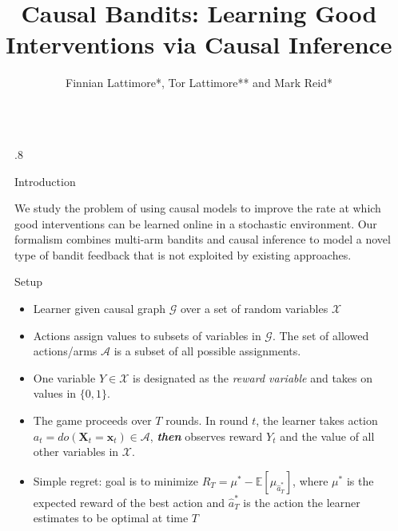 \documentclass[12pt]{beamer}
\title{Causal Bandits: Learning Good Interventions via Causal Inference} %
\author{Finnian Lattimore*, Tor Lattimore** and Mark Reid*} %
\institute{*Australian National University and Data61, ** Indiana University Bloomington} %
\newlength{\sepwid}
\newlength{\onecolwid}
\newcommand{\E}[1]{\mathbb E\left[#1\right]}
\newcommand{\simpleregret}{R_T}
\let\vec\mathbf
\begin{document}

\setlength{\belowcaptionskip}{12pt} %


\begin{frame}[t] %

\begin{columns}[t] %

\begin{column}{\sepwid}\end{column} %

\begin{column}{.8\onecolwid} %


\begin{block}{Introduction}

We study the problem of using causal models to improve the rate at which good interventions can be learned online in a stochastic environment. 
Our formalism combines multi-arm bandits and causal inference to model a novel type of bandit feedback that is not exploited by existing approaches.
\end{block}

\begin{block}{Setup}
\begin{itemize}
\setlength\itemsep{28pt}
\item Learner given causal graph $\mathcal{G}$ over a set of random variables $\mathcal{X}$
\item Actions assign values to subsets of variables in $\mathcal{G}$. The set of allowed actions/arms $\mathcal{A}$ is a subset of all possible assignments.
\item One variable $Y \in \mathcal{X}$ is designated as the \emph{reward variable} and takes on values in $\{0, 1\}$.
\item The game proceeds over $T$ rounds. In round $t$, the learner takes action $a_t = do(\vec{X}_t = \vec{x}_t) \in \mathcal{A}$, \textbf{\emph{then}} observes reward $Y_t$ and the value of all other variables in $\mathcal{X}$.
\item Simple regret: goal is to minimize $\simpleregret = \mu^* - \E{\mu_{\hat a^*_T}}$, where $\mu^*$ is the expected reward of the best action and $\hat a^*_T$ is the action the learner estimates to be optimal at time $T$
\end{itemize}



\end{block}
\end{column}
\end{columns}
\end{frame}
\end{document}
